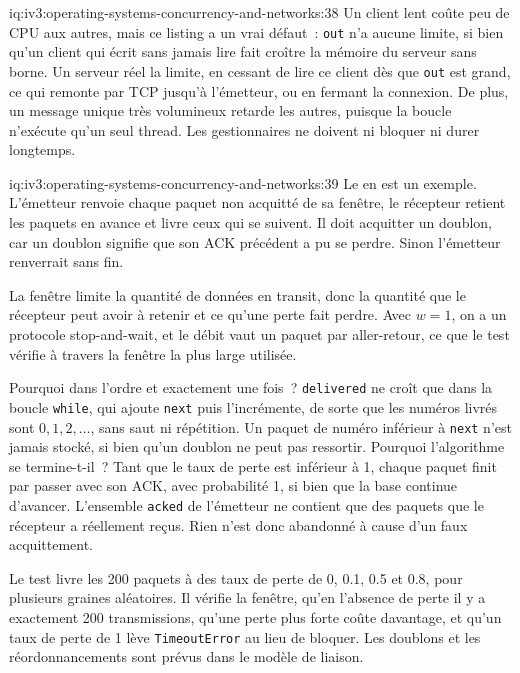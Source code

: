 \begin{solution}{iq:iv3:operating-systems-concurrency-and-networks:38}
Un client lent coûte peu de CPU aux autres, mais ce listing a un vrai défaut~: \texttt{out} n'a aucune limite, si bien qu'un client qui écrit sans jamais lire fait croître la mémoire du serveur sans borne. Un serveur réel la limite, en cessant de lire ce client dès que \texttt{out} est grand, ce qui remonte par TCP jusqu'à l'émetteur, ou en fermant la connexion. De plus, un message unique très volumineux retarde les autres, puisque la boucle n'exécute qu'un seul thread. Les gestionnaires ne doivent ni bloquer ni durer longtemps.

\end{solution}

\begin{solution}{iq:iv3:operating-systems-concurrency-and-networks:39}
Le  en est un exemple. L'émetteur renvoie chaque paquet non acquitté de sa fenêtre, le récepteur retient les paquets en avance et livre ceux qui se suivent. Il doit acquitter un doublon, car un doublon signifie que son ACK précédent a pu se perdre. Sinon l'émetteur renverrait sans fin.
\label{lst:iv3:os:reliable}

La fenêtre limite la quantité de données en transit, donc la quantité que le récepteur peut avoir à retenir et ce qu'une perte fait perdre. Avec $w = 1$, on a un protocole stop-and-wait, et le débit vaut un paquet par aller-retour, ce que le test vérifie à travers la fenêtre la plus large utilisée.

Pourquoi dans l'ordre et exactement une fois~? \texttt{delivered} ne croît que dans la boucle \texttt{while}, qui ajoute \texttt{next} puis l'incrémente, de sorte que les numéros livrés sont $0, 1, 2, \dots$, sans saut ni répétition. Un paquet de numéro inférieur à \texttt{next} n'est jamais stocké, si bien qu'un doublon ne peut pas ressortir. Pourquoi l'algorithme se termine-t-il~? Tant que le taux de perte est inférieur à 1, chaque paquet finit par passer avec son ACK, avec probabilité 1, si bien que la base continue d'avancer. L'ensemble \texttt{acked} de l'émetteur ne contient que des paquets que le récepteur a réellement reçus. Rien n'est donc abandonné à cause d'un faux acquittement.

Le test livre les 200 paquets à des taux de perte de 0, 0.1, 0.5 et 0.8, pour plusieurs graines aléatoires. Il vérifie la fenêtre, qu'en l'absence de perte il y a exactement 200 transmissions, qu'une perte plus forte coûte davantage, et qu'un taux de perte de 1 lève \texttt{TimeoutError} au lieu de bloquer. Les doublons et les réordonnancements sont prévus dans le modèle de liaison.


\end{solution}

